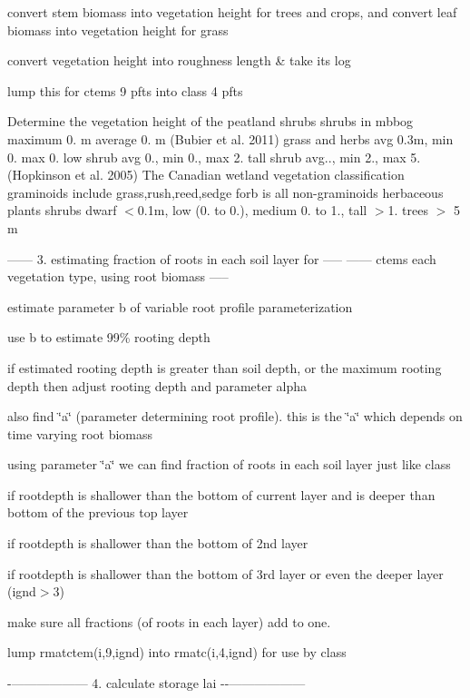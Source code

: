 \begin{DoxyEnumerate}
\item convert stem biomass into vegetation height for trees and crops, and convert leaf biomass into vegetation height for grass
\item convert vegetation height into roughness length \& take its log
\item lump this for ctem\textquotesingle{}s 9 pfts into class\textquotesingle{} 4 pfts

Determine the vegetation height of the peatland shrubs shrubs in mbbog maximum 0. m average 0. m (Bubier et al. 2011) grass and herbs avg 0.\+3m, min 0. max 0. low shrub avg 0., min 0., max 2. tall shrub avg.., min 2., max 5. (Hopkinson et al. 2005) The Canadian wetland vegetation classification graminoids include grass,rush,reed,sedge forb is all non-\/graminoids herbaceous plants shrubs dwarf $<$0.\+1m, low (0. to 0.), medium 0. to 1., tall $>$1. trees $>$ 5 m
\end{DoxyEnumerate}

------ 3. estimating fraction of roots in each soil layer for ----- ------ ctem\textquotesingle{}s each vegetation type, using root biomass -----

estimate parameter b of variable root profile parameterization

use b to estimate 99\% rooting depth

if estimated rooting depth is greater than soil depth, or the maximum rooting depth then adjust rooting depth and parameter alpha

also find \char`\"{}a\char`\"{} (parameter determining root profile). this is the \char`\"{}a\char`\"{} which depends on time varying root biomass

using parameter \char`\"{}a\char`\"{} we can find fraction of roots in each soil layer just like class

if rootdepth is shallower than the bottom of current layer and is deeper than bottom of the previous top layer

if rootdepth is shallower than the bottom of 2nd layer

if rootdepth is shallower than the bottom of 3rd layer or even the deeper layer (ignd$>$3)

make sure all fractions (of roots in each layer) add to one.

lump rmatctem(i,9,ignd) into rmatc(i,4,ignd) for use by class

-\/------------------ 4. calculate storage lai -\/-\/------------------


